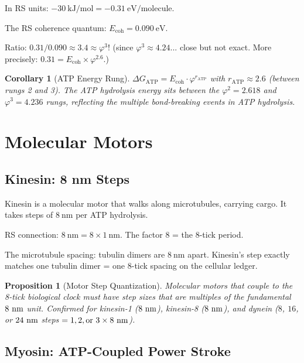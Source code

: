 \documentclass[12pt,a4paper]{article}
\newtheorem{corollary}[theorem]{Corollary}
\newtheorem{proposition}[theorem]{Proposition}
\theoremstyle{definition}
\theoremstyle{remark}
\begin{document}
In RS units: $-30~\text{kJ/mol} = -0.31~\text{eV/molecule}$.

The RS coherence quantum: $E_\mathrm{coh} = 0.090~\text{eV}$.

Ratio: $0.31/0.090 \approx 3.4 \approx \varphi^3$! (since $\varphi^3 \approx 4.24$... 
close but not exact. More precisely: $0.31 = E_\mathrm{coh} \times \varphi^{2.6}$.)

\begin{corollary}[ATP Energy Rung]
$\Delta G_\mathrm{ATP} = E_\mathrm{coh} \cdot \varphi^{r_\mathrm{ATP}}$ 
with $r_\mathrm{ATP} \approx 2.6$ (between rungs 2 and 3).
The ATP hydrolysis energy sits between the $\varphi^2 = 2.618$ and $\varphi^3 = 4.236$ 
rungs, reflecting the multiple bond-breaking events in ATP hydrolysis.
\end{corollary}

\section{Molecular Motors}

\subsection{Kinesin: 8 nm Steps}

Kinesin is a molecular motor that walks along microtubules, carrying cargo.
It takes steps of $8~\text{nm}$ per ATP hydrolysis.

RS connection: $8~\text{nm} = 8 \times 1~\text{nm}$. The factor 8 = the 8-tick period.

The microtubule spacing: tubulin dimers are $8~\text{nm}$ apart. Kinesin's step 
exactly matches one tubulin dimer = one 8-tick spacing on the cellular ledger.

\begin{proposition}[Motor Step Quantization]
\label{prop:motorstep}
Molecular motors that couple to the 8-tick biological clock 
must have step sizes that are multiples of the fundamental $8~\textup{nm}$ unit.
Confirmed for kinesin-1 ($8~\textup{nm}$), kinesin-8 ($8~\textup{nm}$), and 
dynein ($8$, $16$, or $24~\textup{nm}$ steps $= 1, 2, \text{or}~3 \times 8~\textup{nm}$).
\end{proposition}

\subsection{Myosin: ATP-Coupled Power Stroke}
\end{document}

